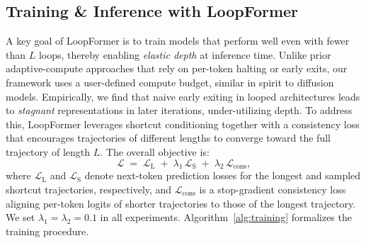 



\subsection{Training \& Inference with LoopFormer}

A key goal of LoopFormer is to train models that perform well even with fewer than $L$ loops, thereby enabling \emph{elastic depth} at inference time. Unlike prior adaptive-compute approaches that rely on per-token halting or early exits, our framework uses a user-defined compute budget, similar in spirit to diffusion models. Empirically, we find that naive early exiting in looped architectures leads to \emph{stagnant} representations in later iterations, under-utilizing depth. To address this, LoopFormer leverages shortcut conditioning together with a consistency loss that encourages trajectories of different lengths to converge toward the full trajectory of length $L$. The overall objective is:
\[
  \mathcal{L}
  \;=\;
  \mathcal{L}_{\text{L}}
  \;+\;
  \lambda_1\,\mathcal{L}_{\text{S}}
  \;+\;
  \lambda_2\,\mathcal{L}_{\text{cons}},
\]
where $\mathcal{L}_{\text{L}}$ and $\mathcal{L}_{\text{S}}$ denote next-token prediction losses for the longest and sampled shortcut trajectories, respectively, and $\mathcal{L}_{\text{cons}}$ is a stop-gradient consistency loss aligning per-token logits of shorter trajectories to those of the longest trajectory. We set $\lambda_{1}=\lambda_{2}=0.1$ in all experiments. Algorithm~\ref{alg:training} formalizes the training procedure.

